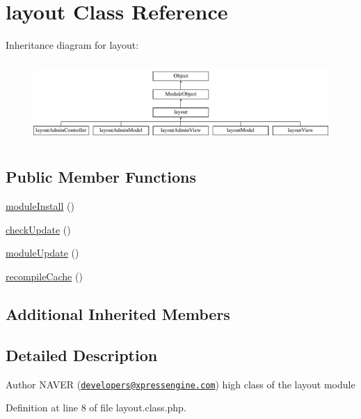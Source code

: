 \hypertarget{classlayout}{}\section{layout Class Reference}
\label{classlayout}
Inheritance diagram for layout\+:\begin{figure}[H]
\begin{center}
\leavevmode
\includegraphics[height=3.089655cm]{classlayout}
\end{center}
\end{figure}
\subsection*{Public Member Functions}
\begin{DoxyCompactItemize}
\item 
\hyperlink{classlayout_a02df5d38eeced2b8b69d299dbdfab644}{module\+Install} ()
\item 
\hyperlink{classlayout_a756e56995ca498f4cc63b18c78bf81c5}{check\+Update} ()
\item 
\hyperlink{classlayout_affc50951ec759146d27e798b7ac779ab}{module\+Update} ()
\item 
\hyperlink{classlayout_ada8199439f32bd6bbb63ce85a52a7c61}{recompile\+Cache} ()
\end{DoxyCompactItemize}
\subsection*{Additional Inherited Members}


\subsection{Detailed Description}
\begin{DoxyAuthor}{Author}
N\+A\+V\+ER (\href{mailto:developers@xpressengine.com}{\tt developers@xpressengine.\+com}) high class of the layout module 
\end{DoxyAuthor}


Definition at line 8 of file layout.\+class.\+php.



